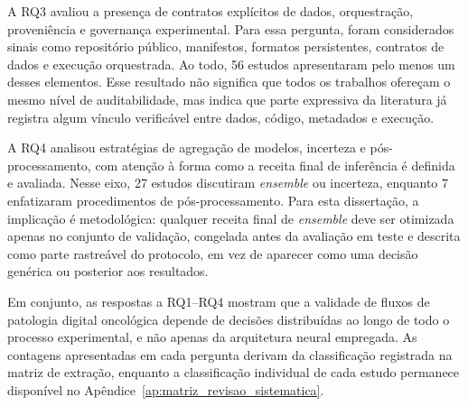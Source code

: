 A RQ3 avaliou a presença de contratos explícitos de dados, orquestração,
proveniência e governança experimental. Para essa pergunta, foram considerados
sinais como repositório público, manifestos, formatos persistentes, contratos de
dados e execução orquestrada. Ao todo, 56 estudos apresentaram pelo menos um
desses elementos. Esse resultado não significa que todos os trabalhos ofereçam o
mesmo nível de auditabilidade, mas indica que parte expressiva da literatura já
registra algum vínculo verificável entre dados, código, metadados e execução.

A RQ4 analisou estratégias de agregação de modelos, incerteza e
pós-processamento, com atenção à forma como a receita final de inferência é
definida e avaliada. Nesse eixo, 27 estudos discutiram \textit{ensemble} ou
incerteza, enquanto 7 enfatizaram procedimentos de pós-processamento. Para esta
dissertação, a implicação é metodológica: qualquer receita final de
\textit{ensemble} deve ser otimizada apenas no conjunto de validação, congelada
antes da avaliação em teste e descrita como parte rastreável do protocolo, em
vez de aparecer como uma decisão genérica ou posterior aos resultados.

Em conjunto, as respostas a RQ1--RQ4 mostram que a validade de fluxos de
patologia digital oncológica depende de decisões distribuídas ao longo de todo o
processo experimental, e não apenas da arquitetura neural empregada. As
contagens apresentadas em cada pergunta derivam da classificação registrada na
matriz de extração, enquanto a classificação individual de cada estudo permanece
disponível no Apêndice~\ref{ap:matriz_revisao_sistematica}. 
